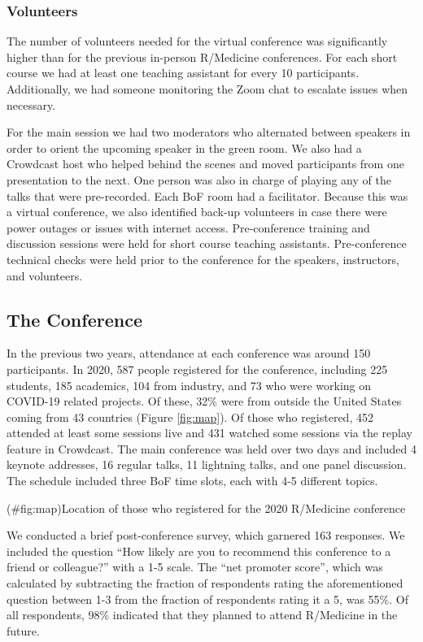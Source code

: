 \hypertarget{volunteers}{%
\subsubsection{Volunteers}\label{volunteers}}

The number of volunteers needed for the virtual conference was
significantly higher than for the previous in-person R/Medicine
conferences. For each short course we had at least one teaching
assistant for every 10 participants. Additionally, we had someone
monitoring the Zoom chat to escalate issues when necessary.

For the main session we had two moderators who alternated between
speakers in order to orient the upcoming speaker in the green room. We
also had a Crowdcast host who helped behind the scenes and moved
participants from one presentation to the next. One person was also in
charge of playing any of the talks that were pre-recorded. Each BoF room
had a facilitator. Because this was a virtual conference, we also
identified back-up volunteers in case there were power outages or issues
with internet access. Pre-conference training and discussion sessions
were held for short course teaching assistants. Pre-conference technical
checks were held prior to the conference for the speakers, instructors,
and volunteers.

\hypertarget{the-conference}{%
\subsection{The Conference}\label{the-conference}}

In the previous two years, attendance at each conference was around 150
participants. In 2020, 587 people registered for the conference,
including 225 students, 185 academics, 104 from industry, and 73 who
were working on COVID-19 related projects. Of these, 32\% were from
outside the United States coming from 43 countries (Figure
\ref{fig:map}). Of those who registered, 452 attended at least some
sessions live and 431 watched some sessions via the replay feature in
Crowdcast. The main conference was held over two days and included 4
keynote addresses, 16 regular talks, 11 lightning talks, and one panel
discussion. The schedule included three BoF time slots, each with 4-5
different topics.

(\#fig:map)Location of those who registered for the 2020 R/Medicine
conference

We conducted a brief post-conference survey, which garnered 163
responses. We included the question ``How likely are you to recommend
this conference to a friend or colleague?'' with a 1-5 scale. The ``net
promoter score'', which was calculated by subtracting the fraction of
respondents rating the aforementioned question between 1-3 from the
fraction of respondents rating it a 5, was 55\%. Of all respondents,
98\% indicated that they planned to attend R/Medicine in the future.

